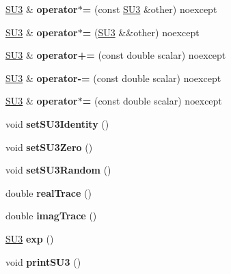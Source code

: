 \begin{DoxyCompactItemize}
\item 
\hyperlink{structSU3}{S\+U3} \& {\bfseries operator$\ast$=} (const \hyperlink{structSU3}{S\+U3} \&other) noexcept\hypertarget{structSU3_a2ca989886022b9c4ce648c30ffbfc00d}{}\label{structSU3_a2ca989886022b9c4ce648c30ffbfc00d}

\item 
\hyperlink{structSU3}{S\+U3} \& {\bfseries operator$\ast$=} (\hyperlink{structSU3}{S\+U3} \&\&other) noexcept\hypertarget{structSU3_a12618dbf115cbee343984b4b4948d665}{}\label{structSU3_a12618dbf115cbee343984b4b4948d665}

\item 
\hyperlink{structSU3}{S\+U3} \& {\bfseries operator+=} (const double scalar) noexcept\hypertarget{structSU3_a263c356674752425cd4a11f76bb8fc36}{}\label{structSU3_a263c356674752425cd4a11f76bb8fc36}

\item 
\hyperlink{structSU3}{S\+U3} \& {\bfseries operator-\/=} (const double scalar) noexcept\hypertarget{structSU3_a8fd821cd749e0f69bd64e63fc1a48b84}{}\label{structSU3_a8fd821cd749e0f69bd64e63fc1a48b84}

\item 
\hyperlink{structSU3}{S\+U3} \& {\bfseries operator$\ast$=} (const double scalar) noexcept\hypertarget{structSU3_a36a3ff37fa53ad0f2650cbcaebeceb94}{}\label{structSU3_a36a3ff37fa53ad0f2650cbcaebeceb94}

\item 
void {\bfseries set\+S\+U3\+Identity} ()\hypertarget{structSU3_a7dc0fede260d68f5967782dde7e3390e}{}\label{structSU3_a7dc0fede260d68f5967782dde7e3390e}

\item 
void {\bfseries set\+S\+U3\+Zero} ()\hypertarget{structSU3_a97e16430a059521473daf753e68cc671}{}\label{structSU3_a97e16430a059521473daf753e68cc671}

\item 
void {\bfseries set\+S\+U3\+Random} ()\hypertarget{structSU3_aeb586c42202c0a418d0212c5c715b42d}{}\label{structSU3_aeb586c42202c0a418d0212c5c715b42d}

\item 
double {\bfseries real\+Trace} ()\hypertarget{structSU3_ab6b435674801c00c31e74dd388cbab61}{}\label{structSU3_ab6b435674801c00c31e74dd388cbab61}

\item 
double {\bfseries imag\+Trace} ()\hypertarget{structSU3_a94a92917c34b8c8ed4a23f080c383e86}{}\label{structSU3_a94a92917c34b8c8ed4a23f080c383e86}

\item 
\hyperlink{structSU3}{S\+U3} {\bfseries exp} ()\hypertarget{structSU3_a50fdb6b9f99e0ceee2878e65e3819a47}{}\label{structSU3_a50fdb6b9f99e0ceee2878e65e3819a47}

\item 
void {\bfseries print\+S\+U3} ()\hypertarget{structSU3_a1c8eb9b867d9be892aea11f54bb2fa42}{}\label{structSU3_a1c8eb9b867d9be892aea11f54bb2fa42}

\end{DoxyCompactItemize}
